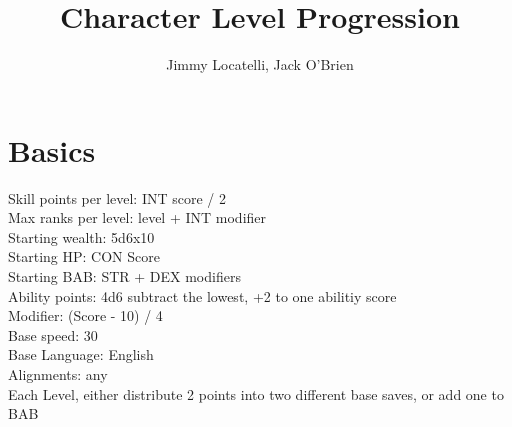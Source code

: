 \documentclass[12pt]{article}
\begin{document}
\title{Character Level Progression}
\author{Jimmy Locatelli, Jack O'Brien}
\maketitle



\section{Basics}

Skill points per level: INT score / 2 \\
Max ranks per level: level + INT modifier \\
Starting wealth: 5d6x10 \\
Starting HP: CON Score \\
Starting BAB: STR + DEX modifiers \\
Ability points: 4d6 subtract the lowest, +2 to one abilitiy score \\
Modifier: (Score - 10) / 4 \\
Base speed: 30\\
Base Language: English\\
Alignments: any\\
Each Level, either distribute 2 points into two different base saves, or add one to BAB \\
\end{document}
